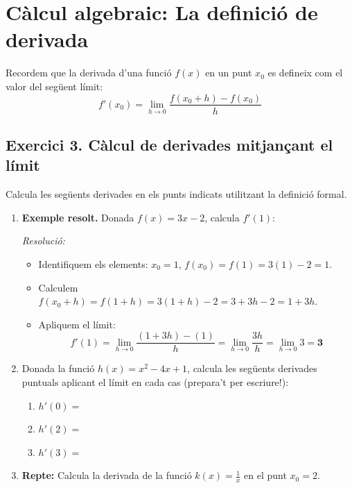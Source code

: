 \documentclass[12pt,a4paper]{article}
\begin{document}
\section*{Càlcul algebraic: La definició de derivada}

Recordem que la derivada d'una funció $f(x)$ en un punt $x_0$ es defineix com el valor del següent límit:
\[ f'(x_0) = \lim_{h \to 0} \frac{f(x_0+h) - f(x_0)}{h} \]

\subsection*{Exercici 3. Càlcul de derivades mitjançant el límit}

Calcula les següents derivades en els punts indicats utilitzant la definició formal.

\begin{enumerate}[label=\textbf{\arabic*.}]
    \item \textbf{Exemple resolt.} Donada $f(x) = 3x - 2$, calcula $f'(1)$:
    
    \textit{Resolució:}
    \begin{itemize}
        \item Identifiquem els elements: $x_0 = 1$, $f(x_0) = f(1) = 3(1)-2 = 1$.
        \item Calculem $f(x_0+h) = f(1+h) = 3(1+h) - 2 = 3 + 3h - 2 = 1 + 3h$.
        \item Apliquem el límit:
        \[ f'(1) = \lim_{h \to 0} \frac{(1 + 3h) - (1)}{h} = \lim_{h \to 0} \frac{3h}{h} = \lim_{h \to 0} 3 = \mathbf{3} \]
    \end{itemize}

    \item Donada la funció \textbf{$h(x) = x^2 - 4x + 1$}, calcula les següents derivades puntuals aplicant el límit en cada cas (prepara't per escriure!):
    \begin{enumerate}[label=\alph*)]
        \item $h'(0) =$ \vspace{0.2cm}
        \item $h'(2) =$ \vspace{0.2cm}
        \item $h'(3) =$ \vspace{0.2cm}
    \end{enumerate}

    \item \textbf{Repte:} Calcula la derivada de la funció $k(x) = \frac{1}{x}$ en el punt $x_0=2$.
\end{enumerate}
\end{document}
